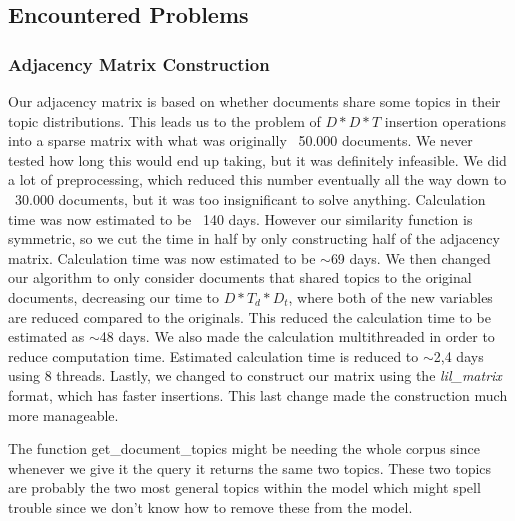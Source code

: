 \subsection{Encountered Problems}

\subsubsection{Adjacency Matrix Construction}\label{app:adj_matrix}
Our adjacency matrix is based on whether documents share some topics in their topic distributions. 
This leads us to the problem of $D*D*T$ insertion operations into a sparse matrix with what was originally ~50.000 documents. We never tested how long this would end up taking, but it was definitely infeasible.
We did a lot of preprocessing, which reduced this number eventually all the way down to ~30.000 documents, but it was too insignificant to solve anything. Calculation time was now estimated to be ~140 days.
However our similarity function is symmetric, so we cut the time in half by only constructing half of the adjacency matrix.
Calculation time was now estimated to be $\sim$69 days.
We then changed our algorithm to only consider documents that shared topics to the original documents, decreasing our time to $D*T_d*D_t$, where both of the new variables are reduced compared to the originals.
This reduced the calculation time to be estimated as $\sim$48 days.
We also made the calculation multithreaded in order to reduce computation time.
Estimated calculation time is reduced to $\sim$2,4 days using 8 threads.
Lastly, we changed to construct our matrix using the \emph{lil\_matrix} format, which has faster insertions.
This last change made the construction much more manageable.


The function get\_document\_topics might be needing the whole corpus since whenever we give it the query it returns the same two topics. 
These two topics are probably the two most general topics within the model which might spell trouble since we don't know how to remove these from the model.

